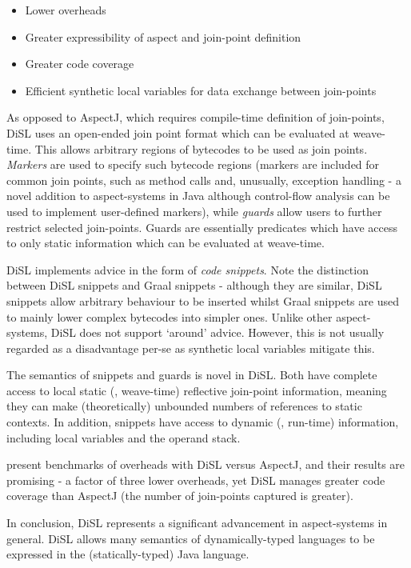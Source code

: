 		\begin{itemize}
			\item Lower overheads
			\item Greater expressibility of aspect and join-point definition
			\item Greater code coverage
			\item Efficient synthetic local variables for data exchange between join-points
		\end{itemize}
		
		As opposed to AspectJ, which requires compile-time definition of join-points, DiSL uses an open-ended join point format which can be evaluated at weave-time. This allows arbitrary regions of bytecodes to be used as join points. \textit{Markers} are used to specify such bytecode regions (markers are included for common join points, such as method calls and, unusually, exception handling - a novel addition to aspect-systems in Java although control-flow analysis can be used to implement user-defined markers), while \textit{guards} allow users to further restrict selected join-points. Guards are essentially predicates which have access to only static information which can be evaluated at weave-time.
		
		DiSL implements advice in the form of \textit{code snippets}. Note the distinction between DiSL snippets and Graal snippets - although they are similar, DiSL snippets allow arbitrary behaviour to be inserted whilst Graal snippets are used to mainly lower complex bytecodes into simpler ones. Unlike other aspect-systems, DiSL does not support `around' advice. However, this is not usually regarded as a disadvantage per-se as synthetic local variables mitigate this.
		
		The semantics of snippets and guards is novel in DiSL. Both have complete access to local static (\ie, weave-time) reflective join-point information, meaning they can make (theoretically) unbounded numbers of references to static contexts. In addition, snippets have access to dynamic (\ie, run-time) information, including local variables and the operand stack.
		
		\citeauthor{Marek2012} present benchmarks of overheads with DiSL versus AspectJ, and their results are promising - a factor of three lower overheads, yet DiSL manages greater code coverage than AspectJ (the number of join-points captured is greater).
		
		In conclusion, DiSL represents a significant advancement in aspect-systems in general. DiSL allows many semantics of dynamically-typed languages to be expressed in the (statically-typed) Java language.
	
